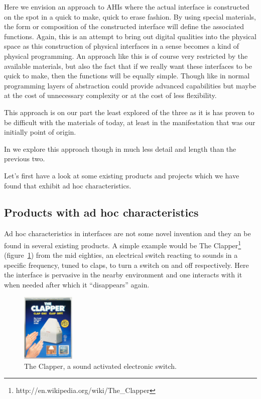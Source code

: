 Here we envision an approach to AHIs where the actual interface is constructed on the spot in a quick to make, quick to erase fashion.
By using special materials, the form or composition of the constructed interface will define the associated functions.
Again, this is an attempt to bring out digital qualities into the physical space as this construction of physical interfaces in a sense becomes a kind of physical programming.
An approach like this is of course very restricted by the available materials, but also the fact that if we really want these interfaces to be quick to make, then the functions will be equally simple.
Though like in normal programming layers of abstraction could provide advanced capabilities but maybe at the cost of unnecessary complexity or at the cost of less flexibility.

This approach is on our part the least explored of the three as it is has proven to be difficult with the materials of today, at least in the manifestation that was our initially point of origin. 

In  we explore this approach though in much less detail and length than the previous two.

Let's first have a look at some existing products and projects which we have found that exhibit ad hoc characteristics. 

\subsection{Products with ad hoc characteristics}
Ad hoc characteristics in interfaces are not some novel invention and they an be found in several existing products.
A simple example would be The Clapper\footnote{http://en.wikipedia.org/wiki/The\_Clapper} (figure~\ref{ch:adhoc:theclapper}) from the mid eighties, an electrical switch reacting to sounds in a specific frequency, tuned to claps, to turn a switch on and off respectively.
Here the interface is pervasive in the nearby environment and one interacts with it when needed after which it ``disappears'' again.

\begin{figure}[hb]
	\centering
  		\includegraphics[width=1in]{figures/theclapper}
	\caption[The Clapper, a sound activated electronic switch.]
   {The Clapper, a sound activated electronic switch.}
   \label{ch:adhoc:theclapper}
\end{figure}

